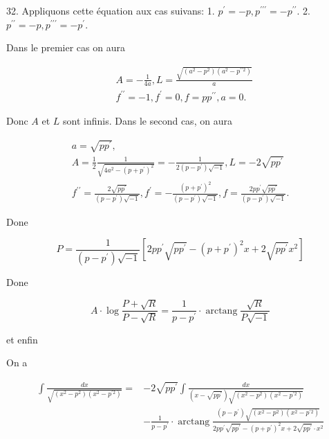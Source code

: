 \documentclass{article}
\begin{document}
32. Appliquons cette équation aux cas suivans:
1. \(p^{\prime}=-p, p^{\prime \prime \prime}=-p^{\prime \prime}\).
2. \(p^{\prime \prime}=-p, p^{\prime \prime \prime}=-p^{\prime}\).

Dans le premier cas on aura

\[
\begin{aligned}
& A=-\frac{1}{4 a}, L=\frac{\sqrt{\left(a^{2}-p^{2}\right)\left(a^{2}-p^{\prime \prime 2}\right)}}{a} \\
& f^{\prime \prime}=-1, f^{\prime}=0, f=p p^{\prime \prime}, a=0 .
\end{aligned}
\]

Donc \(A\) et \(L\) sont infinis. Dans le second cas, on aura

\[
\begin{gathered}
a=\sqrt{p p^{\prime}}, \\
A=\frac{1}{2} \frac{1}{\sqrt{4 a^{2}-\left(p+p^{\prime}\right)^{2}}}=-\frac{1}{2\left(p-p^{\prime}\right) \sqrt{-1}}, L=-2 \sqrt{p p^{\prime}} \\
f^{\prime \prime}=\frac{2 \sqrt{p p^{\prime}}}{\left(p-p^{\prime}\right) \sqrt{-1}}, f^{\prime}=-\frac{\left(p+p^{\prime}\right)^{2}}{\left(p-p^{\prime}\right) \sqrt{-1}}, f=\frac{2 p p^{\prime} \sqrt{p p^{\prime}}}{\left(p-p^{\prime}\right) \sqrt{-1}} .
\end{gathered}
\]

Done

\[
P=\frac{1}{\left(p-p^{\prime}\right) \sqrt{-1}}\left[2 p p^{\prime} \sqrt{p p^{\prime}}-\left(p+p^{\prime}\right)^{2} x+2 \sqrt{p p^{\prime}} x^{2}\right]
\]

Done

\[
A \cdot \log \frac{P+\sqrt{R}}{P-\sqrt{R}}=\frac{1}{p-p^{\prime}} \cdot \operatorname{arctang} \frac{\sqrt{R}}{P \sqrt{-1}}
\]

et enfin

On a

\[
\begin{aligned}
\int \frac{d x}{\sqrt{\left(x^{2}-p^{2}\right)\left(x^{2}-p^{\prime 2}\right)}}= & -2 \sqrt{p p^{\prime}} \int \frac{d x}{\left(x-\sqrt{p p^{\prime}}\right) \sqrt{\left(x^{2}-p^{2}\right)\left(x^{2}-p^{\prime 2}\right)}} \\
& -\frac{1}{p-p^{\prime}} \cdot \operatorname{arctang} \frac{\left(p-p^{\prime}\right) \sqrt{\left(x^{2}-p^{2}\right)\left(x^{2}-p^{\prime 2}\right)}}{2 p p^{\prime} \sqrt{p p^{\prime}}-\left(p+p^{\prime}\right)^{2} x+2 \sqrt{p p^{\prime}} \cdot x^{2}}
\end{aligned}
\]
\end{document}
